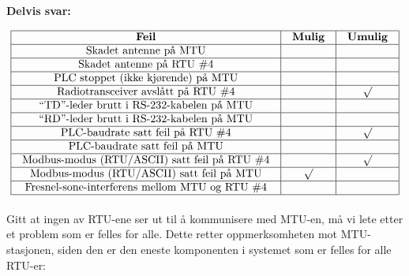 





\noindent
{\bf Delvis svar:}


$$\vbox{\offinterlineskip
\halign{\strut
\vrule \quad\hfil # \ \hfil & 
\vrule \quad\hfil # \ \hfil & 
\vrule \quad\hfil # \ \hfil \vrule \cr
\noalign{\hrule}
%
{\bf Feil} & {\bf Mulig} & {\bf Umulig} \cr
%
\noalign{\hrule}
%
Skadet antenne på MTU &  &  \cr
%
\noalign{\hrule}
%
Skadet antenne på RTU \#4 &  &  \cr
%
\noalign{\hrule}
%
PLC stoppet (ikke kjørende) på MTU &  &  \cr
%
\noalign{\hrule}
%
Radiotransceiver avslått på RTU \#4 &  & $\surd$ \cr
%
\noalign{\hrule}
%
``TD''-leder brutt i RS-232-kabelen på MTU &  &  \cr
%
\noalign{\hrule}
%
``RD''-leder brutt i RS-232-kabelen på MTU &  &  \cr
%
\noalign{\hrule}
%
PLC-baudrate satt feil på RTU \#4 &  & $\surd$ \cr
%
\noalign{\hrule}
%
PLC-baudrate satt feil på MTU &  &  \cr
%
\noalign{\hrule}
%
Modbus-modus (RTU/ASCII) satt feil på RTU \#4 &  & $\surd$ \cr
%
\noalign{\hrule}
%
Modbus-modus (RTU/ASCII) satt feil på MTU & $\surd$ &  \cr
%
\noalign{\hrule}
%
Fresnel-sone-interferens mellom MTU og RTU \#4 &  &  \cr
%
\noalign{\hrule}
} %
}$$ %








Gitt at ingen av RTU-ene ser ut til å kommunisere med MTU-en, må vi lete etter et problem som er felles for alle.  Dette retter oppmerksomheten mot MTU-stasjonen, siden den er den eneste komponenten i systemet som er felles for alle RTU-er:



